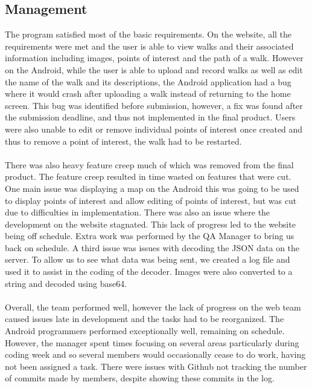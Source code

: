 \documentclass[12pt, portrait]{article}
\begin{document}
\subsection{Management}
The program satisfied most of the basic requirements. On the website, all the requirements were met and the user is able to view walks and their associated information including images, points of interest and the path of a walk. However on the Android, while the user is able to upload and record walks as well as edit the name of the walk and its descriptions, the Android application had a bug where it would crash after uploading a walk instead of returning to the home screen. This bug was identified before submission, however, a fix was found after the submission deadline, and thus not implemented in the final product. Users were also unable to edit or remove individual points of interest once created and thus to remove a point of interest, the walk had to be restarted. 
\\\\
There was also heavy feature creep much of which was removed from the final product. The feature creep resulted in time wasted on features that were cut. One main issue was displaying a map on the Android this was going to be used to display points of interest and allow editing of points of interest, but was cut due to difficulties in implementation. There was also an issue where the development on the website stagnated. This lack of progress led to the website being off schedule. Extra work was performed by the QA Manager to bring us back on schedule. A third issue was issues with decoding the JSON data on the server. To allow us to see what data was being sent, we created a log file and used it to assist in the coding of the decoder. Images were also converted to a string and decoded using base64.
\\\\
Overall, the team performed well, however the lack of progress on the web team caused issues late in development and the tasks had to be reorganized. The Android programmers performed exceptionally well, remaining on schedule. However, the manager spent times focusing on several areas particularly during coding week and so several members would occasionally cease to do work, having not been assigned a task. There were issues with Github not tracking the number of commits made by members, despite showing these commits in the log.
\newpage
\end{document}
